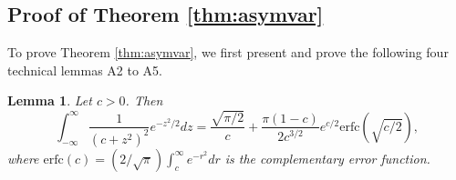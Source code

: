 \documentclass[12pt]{article}
\newtheorem{lemma}{Lemma}
\begin{document}
\subsection{{Proof of Theorem \ref{thm:asymvar}}}
To prove Theorem \ref{thm:asymvar}, we first present and prove the following four technical lemmas A2 to A5.


\begin{lemma}\label{lem:intid1}
Let $c > 0$. Then
\begin{equation*}
    \int_{-\infty}^\infty \frac{1}{(c + z^2)^{2}}e^{-z^2/2} dz = \frac{\sqrt{\pi/2}}{c} + \frac{\pi(1-c)}{2c^{3/2}}e^{c/2}\mathrm{erfc}(\sqrt{c/2}),
\end{equation*}
where $\mathrm{erfc}(c) = (2/\sqrt{\pi})\int_{c}^\infty e^{-r^2} dr$ is the complementary error function.
\end{lemma}
\end{document}
